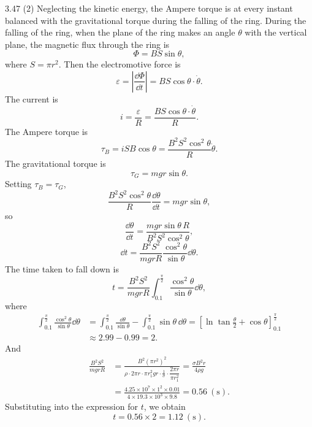 \begin{solution}{3.47}
(2) Neglecting the kinetic energy, the Ampere torque is at every instant balanced with the gravitational torque during the falling of the ring. During the falling of the ring, when the plane of the ring makes an angle $\theta$ with the vertical plane, the magnetic flux through the ring is
\[
\Phi=BS\sin\theta,
\]
where $S=\pi r^2$. Then the electromotive force is
\[
\varepsilon=\left|\frac{\dd\Phi}{\dd t}\right|=BS\cos\theta\cdot\dot{\theta}.
\]
The current is
\[
i=\frac{\varepsilon}{R}=\frac{BS\cos\theta\cdot\dot{\theta}}{R}.
\]
The Ampere torque is
\[
\tau_B=iSB\cos\theta=\frac{B^2S^2\cos^2\theta}{R}\dot{\theta}.
\]
The gravitational torque is
\[
\tau_G=mgr\sin\theta.
\]
Setting $\tau_B=\tau_G$,
\[
\frac{B^2S^2\cos^2\theta}{R}\frac{\dd\theta}{\dd t}=mgr\sin\theta,
\]
so
\[
\frac{\dd\theta}{\dd t}=\frac{mgr\sin\theta\,R}{B^2S^2\cos^2\theta},
\]
\[
\dd t=\frac{B^2S^2}{mgrR}\frac{\cos^2\theta}{\sin\theta}\dd\theta.
\]
The time taken to fall down is
\[
t=\frac{B^2S^2}{mgrR}\int_{0.1}^{\frac{\pi}{2}}\frac{\cos^2\theta}{\sin\theta}\dd\theta,
\]
where
\begin{align*}
\int_{0.1}^{\frac{\pi}{2}}\frac{\cos^2\theta}{\sin\theta}\dd\theta
&= \int_{0.1}^{\frac{\pi}{2}}\frac{\dd\theta}{\sin\theta}-\int_{0.1}^{\frac{\pi}{2}}\sin\theta\,\dd\theta
=\left[\ln\tan\frac{\theta}{2}+\cos\theta\right]_{0.1}^{\frac{\pi}{2}}\\
&\approx 2.99-0.99=2.
\end{align*}
And
\begin{align*}
\frac{B^2S^2}{mgrR}
&= \frac{B^2\left(\pi r^2\right)^2}{\rho\cdot2\pi r\cdot\pi r_1^2gr\cdot\frac{1}{\sigma}\cdot\dfrac{2\pi r}{\pi r_1^2}}
=\frac{\sigma B^2r}{4\rho g}\\
&= \frac{4.25\times10^7\times1^2\times0.01}{4\times19.3\times10^3\times9.8}=0.56\ (\mathrm{s}).
\end{align*}
Substituting into the expression for $t$, we obtain
\[
t=0.56\times2=1.12\ (\mathrm{s}).
\]
\end{solution}

